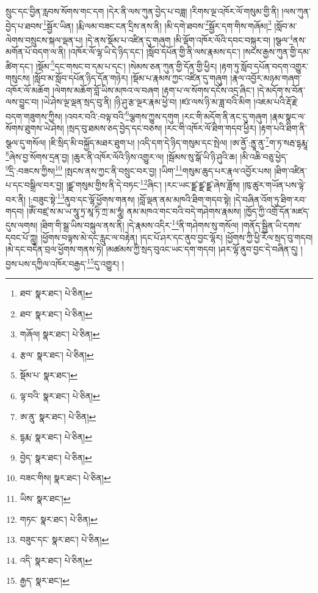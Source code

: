 སྲུང་དང་བྱིན་རླབས་སོགས་གང་དག །དེར་ནི་ལས་ཀུན་བྱེད་པ་བཟླ། །རིགས་ལྔ་འཁོར་ལོ་གསུམ་གྱི་ནི། །ལས་ཀུན་བྱེད་པ་ཐབས་\footnote{ཐབ་  སྣར་ཐང་།  པེ་ཅིན། }སྦྱོར་ཡིན། །རྨི་ལམ་བཟང་ངན་དྲིས་ནས་ནི། །མི་དགེ་ཐབས་\footnote{ཐབ་  སྣར་ཐང་།  པེ་ཅིན། }སྦྱོར་དག་གིས་གཞོམ།\footnote{གཞོལ།  སྣར་ཐང་།  པེ་ཅིན། } །སློབ་མ་ལེགས་བསྲུངས་སྐལ་ལྡན་པ། །དེ་ནས་སྡོམ་པ་འཛིན་དུ་གཞུག །མི་ལྡོག་འཁོར་ལོའི་དབང་བསྐུར་བ། །སྩལ་\footnote{རྩལ་  སྣར་ཐང་།  པེ་ཅིན། }ནས་མགོན་པོ་བདག་ལ་ནི། །འཁོར་ལོ་ལྷ་ཡི་དེ་ཉིད་དང་། །སློབ་དཔོན་གྱི་ནི་ལས་རྣམས་དང་། །སངས་རྒྱས་ཀུན་གྱི་དམ་ཚིག་དང་། །སྡོམ་\footnote{སྡོམ་པ་  སྣར་ཐང་། }དང་གསང་བ་དམ་པ་དང་། །སེམས་ཅན་ཀུན་གྱི་དོན་གྱི་ཕྱིར། །རྟག་ཏུ་སློབ་དཔོན་བདག་འགྱུར་གསུངས། །སློབ་མ་སློབ་དཔོན་ཉིད་དོན་གཉེར། །སྡོམ་པ་རྣམས་ཀྱང་འཛིན་དུ་གཞུག །རྣལ་འབྱོར་མཉམ་གཞག་འཁོར་ལོ་མཆོག །ལེགས་མཆོག་བློ་ཡིས་མཁའ་ལ་བཞག །རྟག་པ་ལ་སོགས་དངོས་འདྲ་ཞིང་། །དེ་མདོག་ས་བོན་ལས་བྱུང་བ། །ཡེ་ཤེས་ལྔ་ལྡན་སྲད་བུ་ནི། །ཉི་ཤུ་རྩ་ལྔར་རྣམ་ཕྱེ་བ། །ཛཿ་ལས་ཉི་མ་ཟླ་བའི་མིག །འཇམ་པའི་རྡོ་རྗེ་བདག་གཟུགས་ཀྱིས། །འབར་བའི་:བལྟ་བའི་\footnote{ལྟ་བའི་  སྣར་ཐང་།  པེ་ཅིན། }ལྕགས་ཀྱུས་དགུག །རང་གི་མདོག་ནི་ནང་དུ་གཞུག །རྣམ་སྣང་ལ་སོགས་ཐུགས་ཡེ་ཤེས། །སྲད་བུ་ཐམས་ཅད་བྱེད་དང་བཅས། །རང་གི་འཁོར་ལོ་ཐིག་གདབ་ཕྱིར། །རྟག་པའི་ཐིག་ནི་སྩལ་དུ་གསོལ། །ཇི་སྲིད་མི་བསྐྱོད་མཐར་ཐུག་པ། །འདི་དག་དེ་ཉིད་གསུམ་དང་སྤེལ། །ཨ་ནྱོ་:ནྱཱ་ནུ་\footnote{ཨ་ནུ་  སྣར་ཐང་།  པེ་ཅིན། }ག་ཏ་སརྦ་དྷརྨཱ་\footnote{དྷརྨ་  སྣར་ཐང་།  པེ་ཅིན། }ཞེས་བྱ་སོགས་དྲན་བྱ། །ཆུར་ནི་འཁོར་ལོའི་ཉིས་འགྱུར་ལ། །སྦོམས་སུ་སྒོ་ཡི་ཉི་ཤུའི་ཆ། །མི་འཆི་བཅུ་ཕྱེད་\footnote{བྱེད་  སྣར་ཐང་།  པེ་ཅིན། }དྲི་:བཟངས་ཀྱིས།\footnote{བཟང་གིས།  སྣར་ཐང་།  པེ་ཅིན། } །སྤངས་ནས་ཀྱང་ནི་བསྲུང་བར་བྱ། །ཡིག་\footnote{ཡིས་  སྣར་ཐང་། }གསུམ་ཆུད་པར་རྣལ་འབྱོར་པས། །ཐིག་འཛིན་པ་དང་བསྒྲིལ་བར་བྱ། །ཛྫ་གསུམ་གྱིས་ནི་དེ་བཏང་\footnote{གཏང་  སྣར་ཐང་།  པེ་ཅིན། }ཞིང་། །རང་ཡང་ཛྫ་ཛྫ་ཛྫ་ཞེས་ཟློས། །ཁུ་ཚུར་གཡོན་པས་ལྟེ་བར་ནི། །:བཟུང་སྟེ་\footnote{བཟུང་དང་  སྣར་ཐང་།  པེ་ཅིན། }ནུབ་དང་ལྷོ་ཕྱོགས་གནས། །བློ་ལྡན་ནམ་མཁའི་ཐིག་གདབ་སྟེ། །དེ་བཞིན་འོག་ཏུ་ཐིག་རབ་གདབ། །ཨོཾ་བཛྲ་ས་མ་ཡ་སཱུ་ཏྲ་མཱ་ཏི་ཀྲ་མ་ཧཱུཾ། ནམ་མཁའ་གང་བའི་བདེ་གཤེགས་རྣམས། །ཁྱོད་ཀྱི་འགྲོ་དོན་མཛད་དུས་ལགས། །ཐིག་གི་སྒྲ་ཡིས་བསྐུལ་ནས་ནི། །དེ་རྣམས་འདིར་\footnote{འདི་  སྣར་ཐང་།  པེ་ཅིན། }ནི་གཤེགས་སུ་གསོལ། །གནོད་སྦྱིན་ཡི་དགས་དབང་པོ་ཀླུ། །ཕྱོགས་བལྟས་མེ་དང་རླུང་ལ་བརྟེན། །དང་པོ་ཤར་དང་ནུབ་བྱང་ལྷོར། །ཕྱོགས་ཀྱི་ཕྱི་རོལ་སྲད་བུ་གདབ། །མེ་དང་བདེན་བྲལ་ཕྱོགས་གནས་ཏེ། །མཚམས་ཀྱི་སྲད་བུའང་ཡང་དག་གདབ། །ཤར་ལྷོ་ནུབ་བྱང་དེ་བཞིན་དུ། །བྱས་པས་དཀྱིལ་འཁོར་བརྒྱད་\footnote{རྒྱད་  སྣར་ཐང་། }དུ་འགྱུར། །
